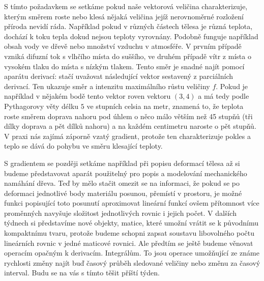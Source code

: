 \documentclass[12pt]{article}
\begin{document}
S tímto požadavkem se setkáme pokud naše vektorová veličina charakterizuje, kterým směrem roste nebo klesá nějaká veličina jejíž nerovnoměrné rozložení příroda nevidí ráda. Například pokud v různých částech tělesa je různá teplota, dochází k toku tepla dokud nejsou teploty vyrovnány. Podobně funguje například obsah vody ve dřevě nebo množství vzduchu v atmosféře. V prvním případě vzniká difuzní tok s vlhčího místa do suššího, ve druhém případě vítr z místa o vysokém tlaku do místa s nízkým tlakem. Tento směr je snadné najít pomocí aparátu derivací: stačí uvažovat následující vektor sestavený z parciálních derivací. Ten ukazuje směr a intenzitu maximálního růstu veličiny $f$. Pokud je například v nějakém bodě tento vektor roven vektoru $(3,4)$ a má tedy podle Pythagorovy věty délku $5$ ve stupních celsia na metr, znamená to, že teplota roste směrem doprava nahoru pod úhlem o něco málo větším než 45 stupňů (tři dílky doprava a pět dílků nahoru) a na každém centimetru naroste o pět stupňů. V praxi nás zajímá záporně vzatý gradient, protože ten charakterizuje pokles a teplo se dává do pohybu ve směru klesající teploty. 

S gradientem se později setkáme například při popisu deformací tělesa až si budeme představovat aparát použitelný pro popis a modelování mechanického namáhání dřeva. Teď by mělo stačit omezit se na informaci, že pokud se po deformaci jednotlivé body materiálu posunou, přemístí v prostoru, je možné funkci popisující toto posunutí aproximovat lineární funkcí ovšem přítomnost více proměnných navyšuje složitost jednotlivých rovnic i jejich počet. V dalších týdnech si představíme nové objekty, matice, které umožní vrátit se k původnímu kompaktnímu tvaru, protože budeme schopni zapsat soustavu libovolného počtu lineárních rovnic v jedné maticové rovnici. Ale předtím se ještě budeme věnovat operacím opačným k derivacím. Integrálům. To jsou operace umožňující ze známe rychlosti změny najít buď časový průběh sledované veličiny nebo změnu za časový interval. Budu se na vás s tímto těšit příští týden. 
\end{document}
